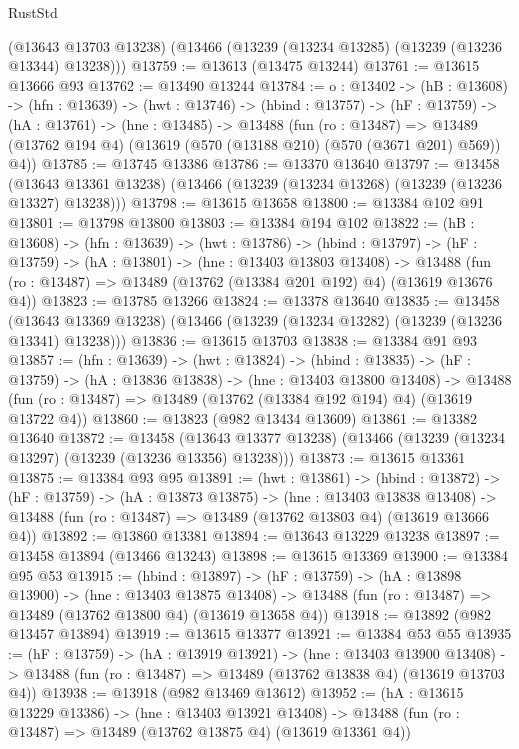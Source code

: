 \begin{lexlean}{RustStd}
\begin{coremodule}
    (@13643 @13703 @13238)
    (@13466 (@13239 (@13234 @13285) (@13239 (@13236 @13344) @13238)))
@13759 := @13613 (@13475 @13244)
@13761 := @13615 @13666 @93
@13762 := @13490 @13244
@13784 := {o : @13402} ->
  (hB : @13608) ->
  (hfn : @13639) ->
  (hwt : @13746) ->
  (hbind : @13757) ->
  (hF : @13759) ->
  (hA : @13761) ->
  (hne : @13485) ->
  @13488
    (fun (ro : @13487) =>
    @13489 (@13762 @194 @4) (@13619 (@570 (@13188 @210) (@570 (@3671 @201) @569)) @4))
@13785 := @13745 @13386
@13786 := @13370 @13640
@13797 := @13458
    (@13643 @13361 @13238)
    (@13466 (@13239 (@13234 @13268) (@13239 (@13236 @13327) @13238)))
@13798 := @13615 @13658
@13800 := @13384 @102 @91
@13801 := @13798 @13800
@13803 := @13384 @194 @102
@13822 := (hB : @13608) ->
  (hfn : @13639) ->
  (hwt : @13786) ->
  (hbind : @13797) ->
  (hF : @13759) ->
  (hA : @13801) ->
  (hne : @13403 @13803 @13408) ->
  @13488 (fun (ro : @13487) => @13489 (@13762 (@13384 @201 @192) @4) (@13619 @13676 @4))
@13823 := @13785 @13266
@13824 := @13378 @13640
@13835 := @13458
    (@13643 @13369 @13238)
    (@13466 (@13239 (@13234 @13282) (@13239 (@13236 @13341) @13238)))
@13836 := @13615 @13703
@13838 := @13384 @91 @93
@13857 := (hfn : @13639) ->
  (hwt : @13824) ->
  (hbind : @13835) ->
  (hF : @13759) ->
  (hA : @13836 @13838) ->
  (hne : @13403 @13800 @13408) ->
  @13488 (fun (ro : @13487) => @13489 (@13762 (@13384 @192 @194) @4) (@13619 @13722 @4))
@13860 := @13823 (@982 @13434 @13609)
@13861 := @13382 @13640
@13872 := @13458
    (@13643 @13377 @13238)
    (@13466 (@13239 (@13234 @13297) (@13239 (@13236 @13356) @13238)))
@13873 := @13615 @13361
@13875 := @13384 @93 @95
@13891 := (hwt : @13861) ->
  (hbind : @13872) ->
  (hF : @13759) ->
  (hA : @13873 @13875) ->
  (hne : @13403 @13838 @13408) ->
  @13488 (fun (ro : @13487) => @13489 (@13762 @13803 @4) (@13619 @13666 @4))
@13892 := @13860 @13381
@13894 := @13643 @13229 @13238
@13897 := @13458 @13894 (@13466 @13243)
@13898 := @13615 @13369
@13900 := @13384 @95 @53
@13915 := (hbind : @13897) ->
  (hF : @13759) ->
  (hA : @13898 @13900) ->
  (hne : @13403 @13875 @13408) ->
  @13488 (fun (ro : @13487) => @13489 (@13762 @13800 @4) (@13619 @13658 @4))
@13918 := @13892 (@982 @13457 @13894)
@13919 := @13615 @13377
@13921 := @13384 @53 @55
@13935 := (hF : @13759) ->
  (hA : @13919 @13921) ->
  (hne : @13403 @13900 @13408) ->
  @13488 (fun (ro : @13487) => @13489 (@13762 @13838 @4) (@13619 @13703 @4))
@13938 := @13918 (@982 @13469 @13612)
@13952 := (hA : @13615 @13229 @13386) ->
  (hne : @13403 @13921 @13408) ->
  @13488 (fun (ro : @13487) => @13489 (@13762 @13875 @4) (@13619 @13361 @4))

\end{coremodule}
\end{lexlean}
